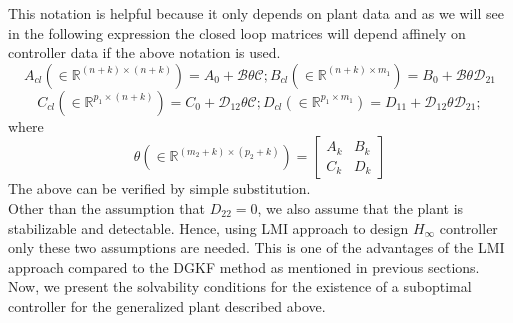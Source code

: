 \documentclass[a4paper,12pt]{article}
\begin{document}
		This notation is helpful because it only depends on plant data and as we will see in the following expression the closed loop matrices will depend affinely on controller data if the above notation is used.
		\[
		A_{cl} (\in \mathbb{R}^{(n+k) \times (n+k)})=A_{0}+\mathscr{B}\theta\mathscr{C};
		B_{cl}(\in \mathbb{R}^{(n+k) \times m_{1}})=B_{0}+\mathscr{B}\theta\mathscr{D}_{21}
		\]
		\[
		C_{cl}(\in \mathbb{R}^{p_{1} \times (n+k)})=C_{0}+\mathscr{D}_{12}\theta\mathscr{C};
		D_{cl}(\in \mathbb{R}^{p_{1} \times m_{1}})=D_{11}+\mathscr{D}_{12}\theta\mathscr{D}_{21};
		\]
		where 
		\[
		\theta (\in \mathbb{R}^{(m_{2}+k) \times (p_{2}+k)})= \begin{bmatrix}
		A_{k} & B_{k} \\ C_{k} & D_{k}
		\end{bmatrix}
		\]
		The above can be verified by simple substitution. \\
		Other than the assumption that $D_{22}=0$, we also assume that the plant is stabilizable and detectable. Hence, using LMI approach to design $H_{\infty}$ controller only these two assumptions are needed. This is one of the advantages of the LMI approach compared to the DGKF method as mentioned in previous sections. Now, we present the solvability conditions for the existence of a suboptimal controller for the generalized plant described above.
\end{document}
